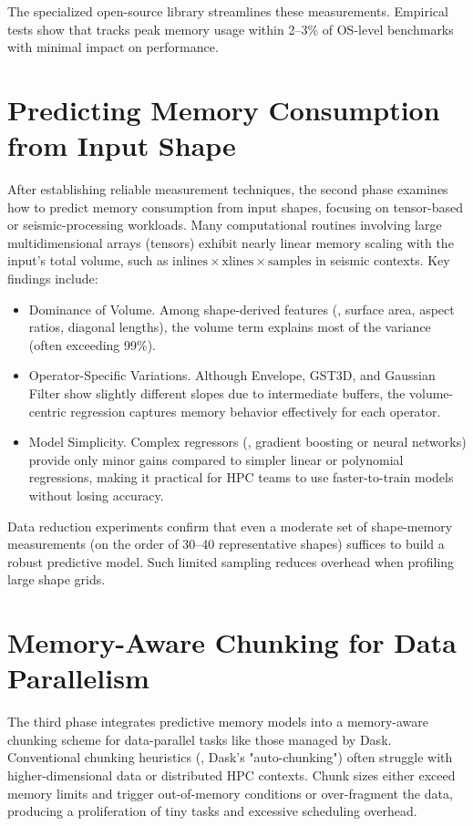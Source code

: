The specialized open-source library \traceq streamlines these measurements.
Empirical tests show that \traceq tracks peak memory usage within 2--3\% of \ac{OS}-level benchmarks with minimal impact on performance.


\section{Predicting Memory Consumption from Input Shape}
\label{sec:conc-predict}

After establishing reliable measurement techniques, the second phase examines how to predict memory consumption from input shapes, focusing on tensor-based or seismic-processing workloads.
Many computational routines involving large multidimensional arrays (tensors) exhibit nearly linear memory scaling with the input's total volume, such as
\(
\text{inlines} \times \text{xlines} \times \text{samples}
\)
in seismic contexts.
Key findings include:
\begin{itemize}
    \item Dominance of Volume.
    Among shape-derived features (\eg, surface area, aspect ratios, diagonal lengths), the volume term explains most of the variance (often exceeding 99\%).
    \item Operator-Specific Variations.
    Although Envelope, \ac{GST3D}, and Gaussian Filter show slightly different slopes due to intermediate buffers, the volume-centric regression captures memory behavior effectively for each operator.
    \item Model Simplicity.
    Complex regressors (\eg, gradient boosting or neural networks) provide only minor gains compared to simpler linear or polynomial regressions, making it practical for \ac{HPC} teams to use faster-to-train models without losing accuracy.
\end{itemize}

Data reduction experiments confirm that even a moderate set of shape-memory measurements (on the order of 30–40 representative shapes) suffices to build a robust predictive model.
Such limited sampling reduces overhead when profiling large shape grids.


\section{Memory-Aware Chunking for Data Parallelism}
\label{sec:conc-chunking}

The third phase integrates predictive memory models into a memory-aware chunking scheme for data-parallel tasks like those managed by Dask.
Conventional chunking heuristics (\eg, Dask's "auto-chunking") often struggle with higher-dimensional data or distributed \ac{HPC} contexts.
Chunk sizes either exceed memory limits and trigger out-of-memory conditions or over-fragment the data, producing a proliferation of tiny tasks and excessive scheduling overhead.

